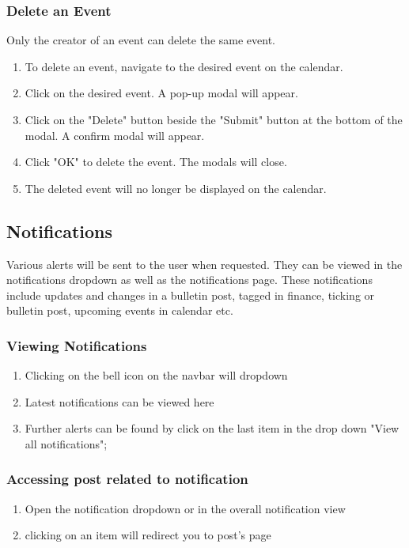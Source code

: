 \documentclass[12pt]{article}
\begin{document}
    \subsubsection{Delete an Event}
    Only the creator of an event can delete the same event.
    \begin{enumerate}
        \item To delete an event, navigate to the desired event on the calendar.
        \item Click on the desired event. A pop-up modal will appear.
        \item Click on the "Delete" button beside the "Submit" button at the bottom of the modal.  A confirm modal will appear.
        \item Click "OK" to delete the event. The modals will close.
        \item The deleted event will no longer be displayed on the calendar.
    \end{enumerate}

    \subsection{Notifications}
    Various alerts will be sent to the user when requested. They can be viewed in the notifications dropdown as well as the notifications page.
    These notifications include updates and changes in a bulletin post, tagged in finance, ticking or bulletin post, upcoming events in calendar etc.
    \subsubsection{Viewing Notifications}
    \begin{enumerate}
        \item Clicking on the bell icon on the navbar will dropdown
        \item Latest notifications can be viewed here
        \item Further alerts can be found by click on the last item in the drop down "View all notifications";
    \end{enumerate}
    \subsubsection{Accessing post related to notification}
    \begin{enumerate}
        \item Open the notification dropdown or in the overall notification view
        \item clicking on an item will redirect you to post's page
    \end{enumerate}
\end{document}
